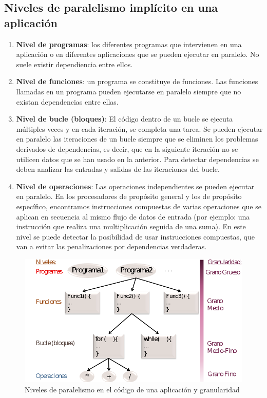 \documentclass[10pt,a4paper,spanish]{report}
\begin{document}
\textcolor[rgb]{0.2,0.4,0.8}{\subsection{Niveles de paralelismo implícito en una aplicación}}
\begin{enumerate}[\color{azul}{\bf $\heartsuit$}]
    \item \textbf{\textcolor[rgb]{0.2,0.4,0.8}{Nivel de programas}}: los diferentes programas que intervienen en una aplicación o en diferentes aplicaciones que se pueden ejecutar en paralelo. No suele existir dependiencia entre ellos.
    \item \textbf{\textcolor[rgb]{0.2,0.4,0.8}{Nivel de funciones}}: un programa se constituye de funciones. Las funciones llamadas en un programa pueden ejecutarse en paralelo siempre que no existan dependencias entre ellas.
    \item \textbf{\textcolor[rgb]{0.2,0.4,0.8}{Nivel de bucle (bloques)}}: El código dentro de un bucle se ejecuta múltiples veces y en cada iteración, se completa una tarea. Se pueden ejecutar en paralelo las iteraciones de un bucle siempre que se eliminen los problemas derivados de dependencias, es decir, que en la siguiente iteración no se utilicen datos que se han usado en la anterior. Para detectar dependencias se deben analizar las entradas y salidas de las iteraciones del bucle.
    \item \textbf{\textcolor[rgb]{0.2,0.4,0.8}{Nivel de operaciones}}: Las operaciones independientes se pueden ejecutar en paralelo. En los procesadores de propósito general y los de propósito específico, encontramos instrucciones compuestas de varias operaciones que se aplican en secuencia al mismo flujo de datos de entrada (por ejemplo: una instrucción que realiza una multiplicación seguida de una suma). En este nivel se puede detectar la posibilidad de usar instrucciones compuestas, que van a evitar las penalizaciones por dependencias verdaderas.
\end{enumerate}
\begin{figure}[!h]
\centering
\includegraphics[width=1\textwidth]{1}
\caption{Niveles de paralelismo en el código de una aplicación y granularidad}
\label{niveles_paralelismo}
\end{figure}
\end{document}
